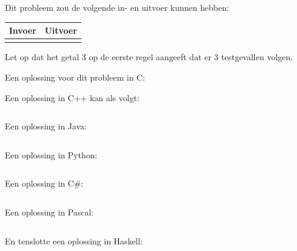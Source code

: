 Dit probleem zou de volgende in- en uitvoer kunnen hebben:

\begin{tabular}{|p{}|p{}|}
\hline
\textbf{Invoer} & \textbf{Uitvoer} \\
\hline
 &
 \\
\hline
\end{tabular}

Let op dat het getal 3 op de eerste regel aangeeft dat er 3
testgevallen volgen.

Een oplossing voor dit probleem in C:

\newpage

Een oplossing in C++ kan als volgt:
\inputminted{cpp}{../examples/example.cc}

Een oplossing in Java:
\inputminted{java}{../examples/example.java}

Een oplossing in Python:
\inputminted{python}{../examples/example.py}

\newpage

Een oplossing in C\#:
\inputminted{csharp}{../examples/example.cs}

Een oplossing in Pascal:
\inputminted{pascal}{../examples/example.pas}

En tenslotte een oplossing in Haskell:
\inputminted{haskell}{../examples/example.hs}


